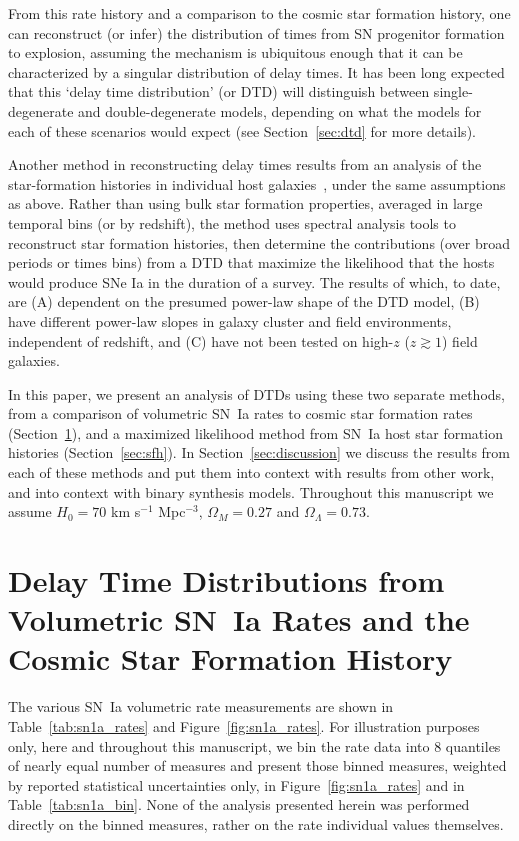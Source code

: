\documentclass[apj]{aastex62}
\begin{document}
From this rate history and a comparison to the cosmic star formation history, one can reconstruct (or infer) the distribution of times from SN progenitor formation to explosion, assuming the mechanism is ubiquitous enough that it can be characterized by a singular distribution of delay times. It has been long expected that this `delay time distribution' (or DTD) will distinguish between single-degenerate \citep{Whelan:1973,Nomoto:1982vh} and double-degenerate \citep{Iben:1984, Webbink:1984} models, depending on what the models for each of these scenarios would expect (see Section~\ref{sec:dtd} for more details).

Another method in reconstructing delay times results from an analysis of the star-formation histories in individual host galaxies~\citep{Brandt:2010, Maoz:2011, Maoz:2012a}, under the same assumptions as above. Rather than using bulk star formation properties, averaged in large temporal bins (or by redshift), the method uses spectral analysis tools to reconstruct star formation histories, then determine the contributions (over broad periods or times bins) from a DTD that maximize the likelihood that the hosts would produce SNe Ia in the duration of a survey. The results of which, to date, are (A) dependent on the presumed power-law shape of the DTD model, (B) have different power-law slopes in galaxy cluster and field environments, independent of redshift, and (C) have not been tested on high-$z$ ($z\gtrsim1$) field galaxies. 

In this paper, we present an analysis of DTDs using these two separate methods, from a comparison of volumetric SN~Ia rates to cosmic star formation rates (Section~\ref{sec:rates}), and a maximized likelihood method from SN~Ia host star formation histories (Section~\ref{sec:sfh}). In Section~\ref{sec:discussion} we discuss the results from each of these methods and put them into context with results from other work, and into context with binary synthesis models. Throughout this manuscript we assume $H_0=70$ km s$^{-1}$ Mpc$^{-3}$, $\Omega_M=0.27$ and $\Omega_\Lambda=0.73$. 

\section{Delay Time Distributions from Volumetric SN~Ia Rates and the Cosmic Star Formation History}\label{sec:rates}
The various SN~Ia volumetric rate measurements are shown in Table~\ref{tab:sn1a_rates} and Figure~\ref{fig:sn1a_rates}. For illustration purposes only, here and throughout this manuscript, we bin the rate data into 8 quantiles of nearly equal number of measures and present those binned measures, weighted by reported statistical uncertainties only, in Figure~\ref{fig:sn1a_rates} and in Table~\ref{tab:sn1a_bin}. None of the analysis presented herein was performed directly on the binned measures, rather on the rate individual values themselves.
\end{document}
